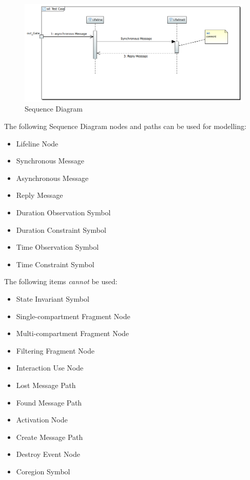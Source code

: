 \begin{figure}[ht]
  \centering
  \includegraphics[width=\textwidth]{images/SequenceDiagram.PNG}
  \caption{Sequence Diagram}
  \label{fig:sd}
\end{figure}


The following Sequence Diagram nodes and paths can be used for
modelling:
\begin{itemize}
\item Lifeline Node 
\item Synchronous Message 
\item Asynchronous Message 
\item Reply Message 
\item Duration Observation Symbol   
\item Duration Constraint Symbol  
\item Time Observation Symbol  
\item Time Constraint Symbol  
\end{itemize}

The following items \emph{cannot} be used:
\begin{itemize}
\item State Invariant Symbol
\item Single-compartment Fragment Node
\item Multi-compartment Fragment Node
\item Filtering Fragment Node
\item Interaction Use Node
\item Lost Message Path
\item Found Message Path
\item Activation Node
\item Create Message Path
\item Destroy Event Node
\item Coregion Symbol

\end{itemize}


